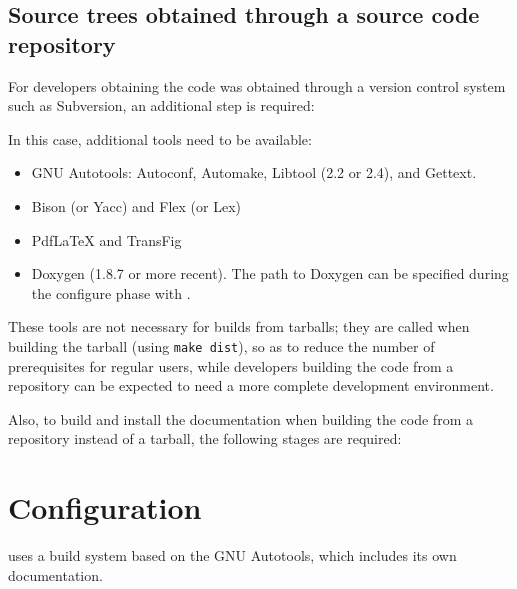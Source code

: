 \documentclass[a4paper,10pt,twoside]{csshortdoc}
\begin{document}
\subsection{Source trees obtained through a source code repository\label{sec:preparerepo}}

For developers obtaining the code was obtained through a version control
system such as Subversion, an additional step is required:


In this case, additional tools need to be available:

\begin{itemize}
\item GNU Autotools: Autoconf, Automake, Libtool (2.2 or 2.4), and Gettext.
\item Bison (or Yacc) and Flex (or Lex)
\item PdfLaTeX and TransFig
\item Doxygen (1.8.7 or more recent). The path to Doxygen can be specified during
the configure phase with .
\end{itemize}

These tools are not necessary for builds from tarballs; they
are called when building the tarball (using {\tt make dist}), so
as to reduce the number of prerequisites for regular users, while
developers building the code from a repository can be expected to
need a more complete development environment.

Also, to build and install the documentation when building the code
from a repository instead of a tarball, the following stages are required:


\section{Configuration\label{sec:config}}

\CS uses a build system based on the GNU Autotools, which includes
its own documentation.
\end{document}
